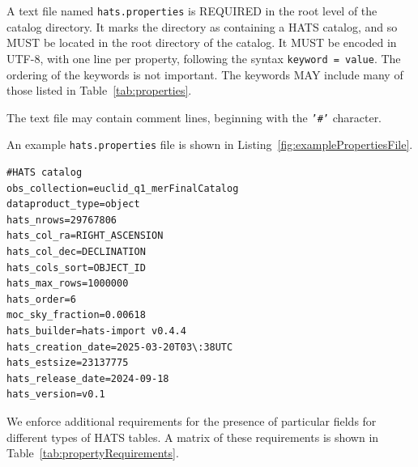 \documentclass[11pt,a4paper]{ivoa}
\begin{document}
A text file named \texttt{hats.properties} is REQUIRED in the root level of the catalog directory.
It marks the directory as containing a HATS catalog, and so MUST be located in the root directory of the catalog.
It MUST be encoded in UTF-8, with one line per property, following the syntax \texttt{keyword~=~value}.
The ordering of the keywords is not important. The keywords MAY include many of those listed in Table~\ref{tab:properties}.

The text file may contain comment lines, beginning with the \texttt{'\#'} character.

An example \texttt{hats.properties} file is shown in Listing~\ref{fig:examplePropertiesFile}.

\begin{minipage}{\linewidth}
\begin{lstlisting}[caption=Example \texttt{hats.properties} file contents, label=fig:examplePropertiesFile]
#HATS catalog
obs_collection=euclid_q1_merFinalCatalog
dataproduct_type=object
hats_nrows=29767806
hats_col_ra=RIGHT_ASCENSION
hats_col_dec=DECLINATION
hats_cols_sort=OBJECT_ID
hats_max_rows=1000000
hats_order=6
moc_sky_fraction=0.00618
hats_builder=hats-import v0.4.4
hats_creation_date=2025-03-20T03\:38UTC
hats_estsize=23137775
hats_release_date=2024-09-18
hats_version=v0.1
\end{lstlisting}
\end{minipage}

We enforce additional requirements for the presence of particular fields for different types of HATS tables. 
A matrix of these requirements is shown in Table~\ref{tab:propertyRequirements}.
\end{document}
